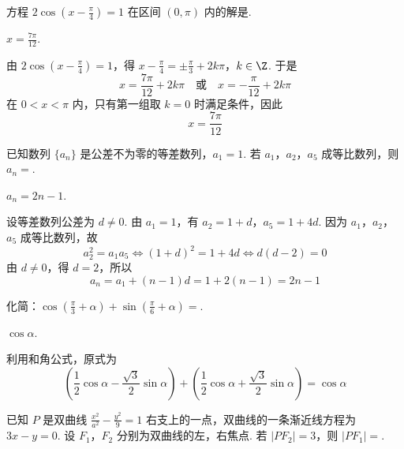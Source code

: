 \begin{problem}
方程 \(2\cos\left(x-\frac{\pi}{4}\right)=1\) 在区间 \((0,\pi)\) 内的解是\fillinblank{}.
\end{problem}

\begin{answer}
\(x=\frac{7\pi}{12}\).
\end{answer}

\begin{solution}
由 \(2\cos(x-\frac\pi4)=1\)，得
\(x-\frac\pi4=\pm\frac\pi3+2k\pi\)，\(k\in\Z\).
于是
\[
x=\frac{7\pi}{12}+2k\pi
\quad\text{或}\quad
x=-\frac\pi{12}+2k\pi
\]
在 \(0<x<\pi\) 内，只有第一组取 \(k=0\) 时满足条件，因此
\[
x=\frac{7\pi}{12}
\]
\end{solution}

\begin{problem}
已知数列 \(\{a_n\}\) 是公差不为零的等差数列，\(a_1=1\). 若 \(a_1\)，\(a_2\)，\(a_5\) 成等比数列，则 \(a_n=\)\fillinblank{}.
\end{problem}

\begin{answer}
\(a_n=2n-1\).
\end{answer}

\begin{solution}
设等差数列公差为 \(d\ne0\). 由 \(a_1=1\)，有
\(a_2=1+d\)，\(a_5=1+4d\).
因为 \(a_1\)，\(a_2\)，\(a_5\) 成等比数列，故
\[
a_2^2=a_1a_5
\iff (1+d)^2=1+4d
\iff d(d-2)=0
\]
由 \(d\ne0\)，得 \(d=2\)，所以
\[
a_n=a_1+(n-1)d=1+2(n-1)=2n-1
\]
\end{solution}

\begin{problem}
化简：\(\cos\left(\frac{\pi}{3}+\alpha\right)+\sin\left(\frac{\pi}{6}+\alpha\right)=\)\fillinblank{}.
\end{problem}

\begin{answer}
\(\cos \alpha\).
\end{answer}

\begin{solution}
利用和角公式，原式为
\[
\left(\frac12\cos\alpha-\frac{\sqrt3}{2}\sin\alpha\right)
+\left(\frac12\cos\alpha+\frac{\sqrt3}{2}\sin\alpha\right)
=\cos\alpha
\]
\end{solution}

\begin{problem}
已知 \(P\) 是双曲线 \(\frac{x^2}{a^2}-\frac{y^2}{9}=1\) 右支上的一点，双曲线的一条渐近线方程为 \(3x-y=0\). 设 \(F_1\)，\(F_2\) 分别为双曲线的左，右焦点. 若 \(|PF_2|=3\)，则 \(|PF_1|=\)\fillinblank{}.
\end{problem}

